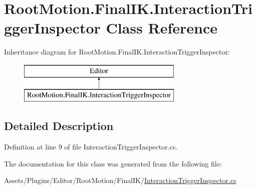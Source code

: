 \hypertarget{class_root_motion_1_1_final_i_k_1_1_interaction_trigger_inspector}{}\section{Root\+Motion.\+Final\+I\+K.\+Interaction\+Trigger\+Inspector Class Reference}
\label{class_root_motion_1_1_final_i_k_1_1_interaction_trigger_inspector}
Inheritance diagram for Root\+Motion.\+Final\+I\+K.\+Interaction\+Trigger\+Inspector\+:\begin{figure}[H]
\begin{center}
\leavevmode
\includegraphics[height=2.000000cm]{class_root_motion_1_1_final_i_k_1_1_interaction_trigger_inspector}
\end{center}
\end{figure}


\subsection{Detailed Description}


Definition at line 9 of file Interaction\+Trigger\+Inspector.\+cs.



The documentation for this class was generated from the following file\+:\begin{DoxyCompactItemize}
\item 
Assets/\+Plugins/\+Editor/\+Root\+Motion/\+Final\+I\+K/\mbox{\hyperlink{_interaction_trigger_inspector_8cs}{Interaction\+Trigger\+Inspector.\+cs}}\end{DoxyCompactItemize}

